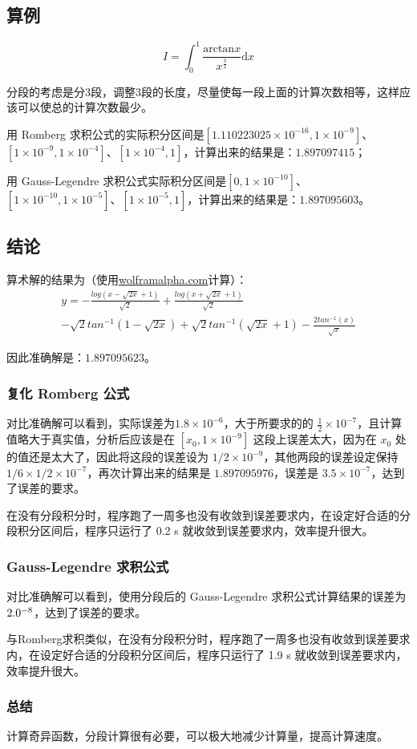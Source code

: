 \subsection{算例}

\begin{equation}
    I = \int_0^1 \frac{\mathrm{arctan}x}{x^{\frac{3}{2}}} \mathrm{d}x
\end{equation}

分段的考虑是分3段，调整3段的长度，尽量使每一段上面的计算次数相等，这样应该可以使总的计算次数最少。

用 Romberg 求积公式的实际积分区间是$[1.110223025\times 10^{-16},1\times 10^{-9}]$、$[1\times 10^{-9},1\times 10^{-4}]$、$[1\times 10^{-4},1]$，计算出来的结果是：$1.897097415$；

用 Gauss-Legendre 求积公式实际积分区间是$[0,1\times 10^{-10}]$、$[1\times 10^{-10},1\times 10^{-5}]$、$[1\times 10^{-5},1]$，计算出来的结果是：$1.897095603$。

\subsection{结论}

算术解的结果为（使用\href{https://www.wolframalpha.com/}{wolframalpha.com}计算）：
\begin{multline}
    y = -\frac{log(x - \sqrt{2x} + 1)}{\sqrt{2}} + \frac{log(x + \sqrt{2x} + 1)}{\sqrt{2}} {} \\
    - \sqrt{2} tan^{-1}(1 - \sqrt{2x}) + \sqrt{2} tan^{-1}(\sqrt{2x} + 1) - \frac{2 tan^{-1}(x)}{\sqrt{x}}
\end{multline}

因此准确解是：$1.897095623$。

\subsubsection{复化 Romberg 公式}

对比准确解可以看到，实际误差为$1.8\times 10^{-6}$，大于所要求的的 $\frac{1}{2}\times 10^{-7}$，且计算值略大于真实值，分析后应该是在 $[x_0,1\times 10^{-9}]$ 这段上误差太大，因为在 $x_0$ 处的值还是太大了，因此将这段的误差设为 $1/2\times 10^{-9}$，其他两段的误差设定保持 $1/6 \times 1/2 \times 10^{-7}$，再次计算出来的结果是 $1.897095976$，误差是 $3.5\times 10^{-7}$，达到了误差的要求。

在没有分段积分时，程序跑了一周多也没有收敛到误差要求内，在设定好合适的分段积分区间后，程序只运行了 0.2 s 就收敛到误差要求内，效率提升很大。

\subsubsection{Gauss-Legendre 求积公式}

对比准确解可以看到，使用分段后的 Gauss-Legendre 求积公式计算结果的误差为 $2.0\time 10^{-8}$，达到了误差的要求。

与Romberg求积类似，在没有分段积分时，程序跑了一周多也没有收敛到误差要求内，在设定好合适的分段积分区间后，程序只运行了 1.9 s 就收敛到误差要求内，效率提升很大。

\subsubsection{总结}

计算奇异函数，分段计算很有必要，可以极大地减少计算量，提高计算速度。


